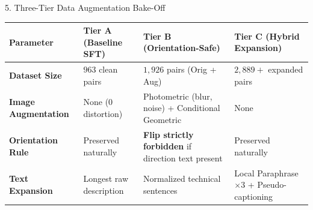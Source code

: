 \documentclass[aspectratio=169]{beamer}
\begin{document}
\begin{frame}{5. Three-Tier Data Augmentation Bake-Off}
  \begin{table}[h]\small
    \centering
    \begin{tabular}{lp{3.5cm}p{3.5cm}p{3.5cm}}
      \toprule
      \textbf{Parameter} & \textbf{Tier A (Baseline SFT)} & \textbf{Tier B (Orientation-Safe)} & \textbf{Tier C (Hybrid Expansion)} \\
      \midrule
      \textbf{Dataset Size} & $963$ clean pairs & $1,926$ pairs (Orig + Aug) & $2,889+$ expanded pairs \\
      \textbf{Image Augmentation} & None ($0$ distortion) & Photometric (blur, noise) + Conditional Geometric & None \\
      \textbf{Orientation Rule} & Preserved naturally & \textbf{Flip strictly forbidden} if direction text present & Preserved naturally \\
      \textbf{Text Expansion} & Longest raw description & Normalized technical sentences & Local Paraphrase $\times 3$ + Pseudo-captioning \\
      \bottomrule
    \end{tabular}
  \end{table}
\end{frame}
\end{document}
